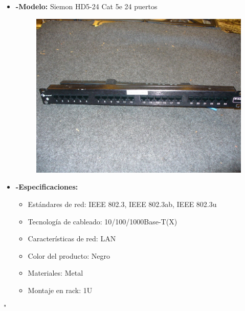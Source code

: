\documentclass{udpreport}
\begin{document}
\begin{itemize}
		\item{\bf-Modelo:} Siemon HD5-24 Cat 5e 24 puertos\\
		\begin{figure}[h]
    		\centering
    	\includegraphics[width=\textwidth]{patchpanel.jpg}
		\end{figure}
		\item{\bf-Especificaciones:}
		\begin{itemize}
			\item Estándares de red: IEEE 802.3, IEEE 802.3ab, IEEE 802.3u\\
			\item Tecnología de cableado: 10/100/1000Base-T(X)\\
			\item Características de red: LAN\\
			\item Color del producto: Negro\\
			\item Materiales: Metal\\
			\item Montaje en rack: 1U\\
		\end{itemize}
	\end{itemize}"
\end{document}
